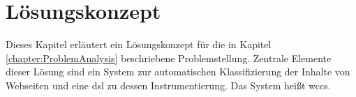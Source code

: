 \chapter{Lösungskonzept}
    \label{chapter:SolutionConcept}
    Dieses Kapitel erläutert ein Lösungskonzept für die in Kapitel \ref{chapter:ProblemAnalysis} beschriebene Problemstellung.
    Zentrale Elemente dieser Lösung sind ein System zur automatischen Klassifizierung der Inhalte von Webseiten
    und eine \gls{dsl} zu dessen Instrumentierung.
    Das System heißt \gls{wccs}.

    
    
    
    
    
    
    
    
    
